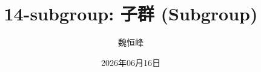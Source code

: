 \documentclass[]{beamer}
\title[14-subgroup: 子群]{14-subgroup: 子群 (Subgroup)}
\author[魏恒峰]{\large 魏恒峰}
\institute{hfwei@hnu.edu.cn}
\date{2026年06月16日}
\begin{document}
\maketitle



\thankyou{}

\end{document}

